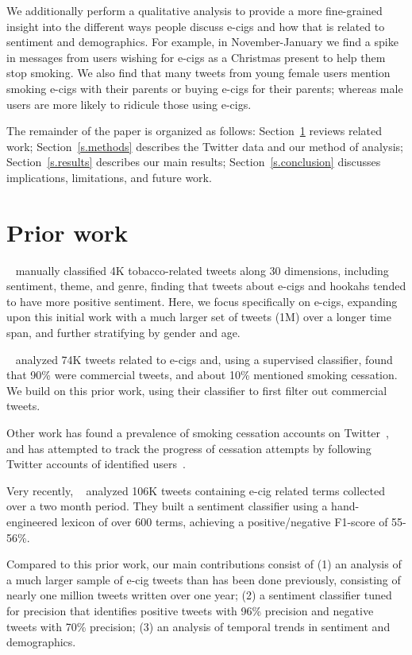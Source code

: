\documentclass{sig-alternate}
\newcommand{\citenoun}[1]{{\citeauthor{#1}~\cite{#1}}}
\begin{document}
We additionally perform a qualitative analysis to provide a more fine-grained
insight into the different ways people discuss e-cigs and how that is related
to sentiment and demographics. For example, in November-January we find a
spike in messages from users wishing for e-cigs as a Christmas present to help
them stop smoking. We also find that many tweets from young female users
mention smoking e-cigs with their parents or buying e-cigs for their parents;
whereas male users are more likely to ridicule those using e-cigs.

The remainder of the paper is organized as follows: Section~\ref{s.prior}
reviews related work; Section~\ref{s.methods} describes the Twitter data and
our method of analysis; Section~\ref{s.results} describes our main results;
Section~\ref{s.conclusion} discusses implications, limitations, and future
work.



\section{Prior work}
\label{s.prior}

\citenoun{myslin2013using} manually classified 4K tobacco-related tweets
along 30 dimensions, including sentiment, theme, and genre, finding that
tweets about e-cigs and hookahs tended to have more positive sentiment. Here,
we focus specifically on e-cigs, expanding upon this initial work with a much
larger set of tweets (1M) over a longer time span, and further
stratifying by gender and age.

\citenoun{huang2014cross} analyzed 74K tweets related to e-cigs and,
using a supervised classifier, found that 90\% were commercial tweets, and
about 10\% mentioned smoking cessation. We build on this prior work, using
their classifier to first filter out commercial tweets.

Other work has found a prevalence of smoking cessation accounts on
Twitter~\cite{prochaska2012twitter}, and has attempted to track the progress
of cessation attempts by following Twitter accounts of identified
users~\cite{murnane2014unraveling}.

Very recently, \citenoun{godea2015analysis} analyzed 106K tweets containing
e-cig related terms collected over a two month period. They built a sentiment
classifier using a hand-engineered lexicon of over 600 terms, achieving a
positive/negative F1-score of 55-56\%.

Compared to this prior work, our main contributions consist of (1) an analysis
of a much larger sample of e-cig tweets than has been done previously,
consisting of nearly one million tweets written over one year; (2) a sentiment
classifier tuned for precision that identifies positive tweets with 96\%
precision and negative tweets with 70\% precision; (3) an analysis of temporal
trends in sentiment and demographics.
\end{document}
